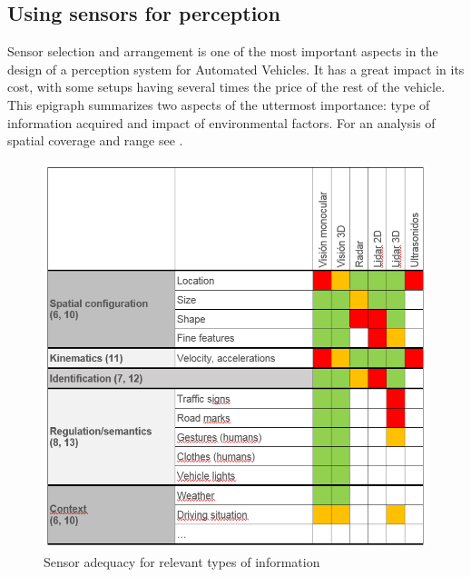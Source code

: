 \subsection{Using sensors for perception}
\label{sec:03-e-sensors-for-perception}

Sensor selection and arrangement is one of the most important aspects in the 
design of a perception system for Automated Vehicles. It has a great impact
in its cost, with some setups having several times the price of the rest of 
the vehicle. 
This epigraph summarizes two aspects of the uttermost importance: type of 
information acquired and impact of environmental factors. For an analysis of
spatial coverage and range see \cite{Schoettle2017}.

\begin{figure}%
    \centering
    \includegraphics[width=0.95\linewidth]{"img/information_types_sensors_"} 
    \caption{Sensor adequacy for relevant types of information}
    \label{fig:information_vs_sensors}
\end{figure}
